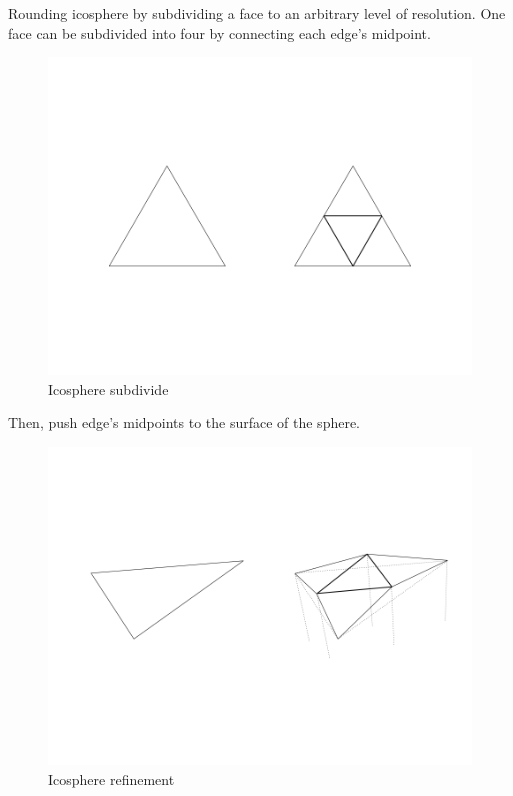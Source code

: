 Rounding icosphere by subdividing a face to an arbitrary level of resolution. One face can be subdivided into four by connecting each edge's midpoint.

\begin{figure}[H]
\caption{Icosphere subdivide}
\label{fig:icosphere-subdivide}
\centering
\includegraphics[width=\linewidth]{Figures/icosphere-subdivide.png}
\decoRule
\end{figure}

Then, push edge's midpoints to the surface of the sphere.

\begin{figure}[H]
\caption{Icosphere refinement}
\label{fig:icosphere-refinement}
\centering
\includegraphics[width=\linewidth]{Figures/icosphere-refinement.png}
\decoRule
\end{figure}

